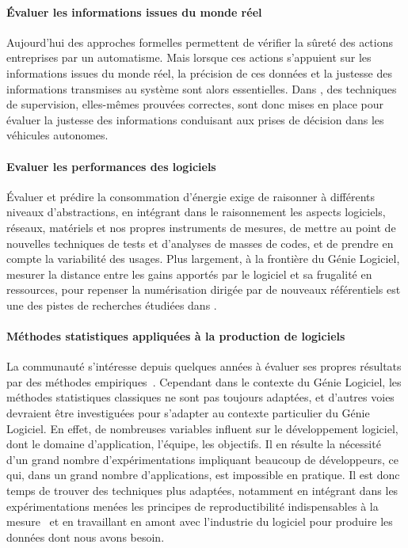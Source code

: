 \documentclass[11pt]{article}
\newcommand{\GL}[0]{Génie Logiciel\xspace}
\newcommand{\defi}[1]{\cite[défi]{#1}}
\begin{document}
\paragraph{Évaluer les informations issues du monde réel}
Aujourd'hui des approches formelles permettent de vérifier la sûreté des actions entreprises par un automatisme. Mais lorsque ces actions s'appuient sur les informations issues du monde réel, la précision de ces données et la justesse des informations transmises au système sont alors essentielles. Dans \defi{emergents}, 
des techniques de supervision,
elles-mêmes prouvées correctes, sont donc mises en place pour évaluer la justesse des informations conduisant aux prises de décision dans les véhicules autonomes.
 
 \paragraph{Evaluer les performances des logiciels}
Évaluer et prédire la consommation d'énergie  exige de raisonner à différents niveaux d'abstractions, en intégrant dans le raisonnement les aspects logiciels, réseaux, matériels et nos propres instruments de mesures, de mettre au point de nouvelles techniques de tests et d'analyses de masses de codes, et de prendre en compte la variabilité des usages. Plus largement, à la frontière du \GL,  mesurer la distance entre les gains apportés par le logiciel et sa frugalité en ressources, pour repenser la numérisation dirigée par de nouveaux référentiels est une des pistes de recherches étudiées dans \defi{vert}.


\paragraph{Méthodes statistiques appliquées à la production de logiciels}
La communauté s'intéresse depuis quelques années à évaluer ses propres résultats par des méthodes empiriques~\cite{yu2019characterizing}. Cependant dans le contexte du \GL, les méthodes statistiques classiques ne sont pas toujours adaptées, et d'autres voies devraient être investiguées pour s'adapter au contexte particulier du \GL. En effet, de nombreuses variables influent sur le développement logiciel, dont le domaine d'application, l'équipe, les objectifs. 
Il en résulte la nécessité d'un grand nombre d'expérimentations impliquant beaucoup de développeurs, ce qui, dans un grand nombre d'applications, est impossible en pratique. Il est donc temps de trouver des techniques plus adaptées, notamment en intégrant dans les expérimentations menées les principes de reproductibilité indispensables à la mesure~\defi{GLE} et en travaillant en amont avec l'industrie du logiciel pour produire les données dont nous avons besoin.
\end{document}
